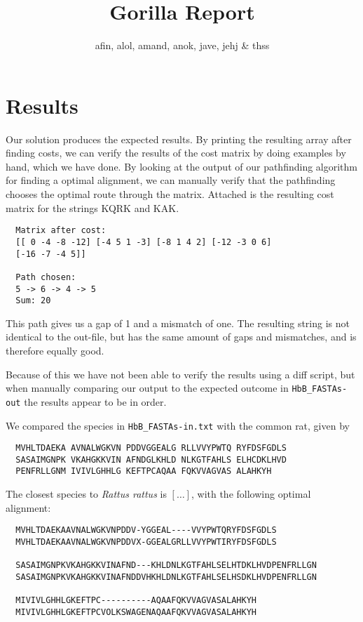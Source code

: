 \documentclass{tufte-handout}
\title{Gorilla Report}
\author{afin, alol, amand, anok, jave, jehj \& thss}
\begin{document}
  \maketitle

  \section{Results}

  Our solution produces the expected results. By printing the resulting array after finding costs, we can verify the results of the cost matrix by doing examples by hand, which we have done. By looking at the output of our pathfinding algorithm for finding a optimal alignment, we can manually verify that the pathfinding chooses the optimal route through the matrix.
Attached is the resulting cost matrix for the strings KQRK and KAK.

\begin{verbatim}
  Matrix after cost: 
  [[ 0 -4 -8 -12] [-4 5 1 -3] [-8 1 4 2] [-12 -3 0 6]
  [-16 -7 -4 5]]
  
  Path chosen:
  5 -> 6 -> 4 -> 5 
  Sum: 20
\end{verbatim}

  This path gives us a gap of 1 and a mismatch of one. The resulting string is not identical to the out-file, but has the same amount of gaps and mismatches, and is therefore equally good.

  Because of this we have not been able to verify the results using a diff script, but when manually comparing our output to the expected outcome in \texttt{HbB\_FASTAs-out} the results appear to be in order.

  We compared the species in \verb!HbB_FASTAs-in.txt!
  with the common rat, given by

  \begin{verbatim}
  MVHLTDAEKA AVNALWGKVN PDDVGGEALG RLLVVYPWTQ RYFDSFGDLS
  SASAIMGNPK VKAHGKKVIN AFNDGLKHLD NLKGTFAHLS ELHCDKLHVD
  PENFRLLGNM IVIVLGHHLG KEFTPCAQAA FQKVVAGVAS ALAHKYH
  \end{verbatim}

  The closest species to \emph{Rattus rattus} is $[\ldots]$, with the following optimal alignment:

\medskip
  \begin{fullwidth}\small
  \begin{verbatim}
  MVHLTDAEKAAVNALWGKVNPDDV-YGGEAL----VVYPWTQRYFDSFGDLS
  MVHLTDAEKAAVNALWGKVNPDDVX-GGEALGRLLVVYPWTIRYFDSFGDLS

  SASAIMGNPKVKAHGKKVINAFND---KHLDNLKGTFAHLSELHTDKLHVDPENFRLLGN
  SASAIMGNPKVKAHGKKVINAFNDDVHKHLDNLKGTFAHLSELHSDKLHVDPENFRLLGN

  MIVIVLGHHLGKEFTPC----------AQAAFQKVVAGVASALAHKYH
  MIVIVLGHHLGKEFTPCVOLKSWAGENAQAAFQKVVAGVASALAHKYH
  \end{verbatim}
\end{fullwidth}
\end{document}
